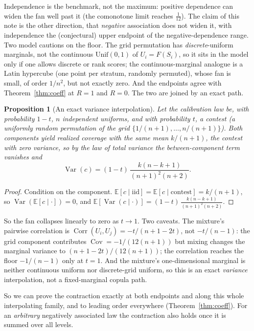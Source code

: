 \documentclass[11pt]{article}
\newtheorem{proposition}{Proposition}
\begin{document}
Independence is the benchmark, not the maximum: positive dependence can widen the fan well past it
(the comonotone limit reaches $\tfrac1{12}$). The claim of this note is the other direction, that
\emph{negative} association does not widen it, with independence the (conjectural) upper endpoint of
the negative-dependence range. Two model cautions on the floor. The grid permutation has
\emph{discrete}-uniform marginals, not the continuous $\mathrm{Unif}(0,1)$ of $U_i=F(S_i)$, so it sits
in the model only if one allows discrete or rank scores; the continuous-marginal analogue is a Latin
hypercube (one point per stratum, randomly permuted), whose fan is small, of order $1/n^2$, but not
exactly zero. And the endpoints agree with Theorem~\ref{thm:coeff} at $R=1$ and $R=0$. The two are
joined by an exact path.

\begin{proposition}[An exact variance interpolation]\label{prop:path}
Let the calibration law be, with probability $1-t$, $n$ independent uniforms, and with probability
$t$, a contest (a uniformly random permutation of the grid $\{1/(n+1),\dots,n/(n+1)\}$). Both
components yield realized coverage with the same mean $k/(n+1)$, the contest with zero variance, so by
the law of total variance the between-component term vanishes and
\begin{equation}
\operatorname{Var}(c)=(1-t)\,\frac{k(n-k+1)}{(n+1)^2(n+2)} .
\end{equation}
\end{proposition}

\begin{proof}
Condition on the component. $\mathbb E[c\mid\text{iid}]=\mathbb E[c\mid\text{contest}]=k/(n+1)$, so
$\operatorname{Var}(\mathbb E[c\mid\cdot])=0$, and $\mathbb E[\operatorname{Var}(c\mid\cdot)]=
(1-t)\,\tfrac{k(n-k+1)}{(n+1)^2(n+2)}$.
\end{proof}

So the fan collapses linearly to zero as $t\to1$. Two caveats. The mixture's pairwise
correlation is $\operatorname{Corr}(U_i,U_j)=-t/(n+1-2t)$, not $-t/(n-1)$: the grid component
contributes $\operatorname{Cov}=-1/(12(n+1))$ but mixing changes the marginal variance to
$(n+1-2t)/(12(n+1))$; the correlation reaches the floor $-1/(n-1)$ only at $t=1$. And the mixture's
one-dimensional marginal is neither continuous uniform nor discrete-grid uniform, so this is an exact
\emph{variance} interpolation, not a fixed-marginal copula path.

So we can prove the contraction exactly at both endpoints and along this whole interpolating family,
and to leading order everywhere (Theorem~\ref{thm:coeff}). For an \emph{arbitrary} negatively
associated law the contraction also holds once it is summed over all levels.
\end{document}
